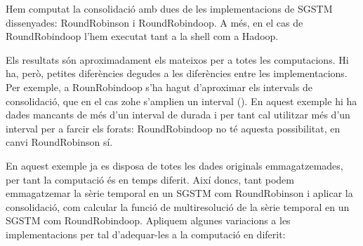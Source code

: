 Hem computat la consolidació amb dues de les implementacions de
\gls{SGSTM} dissenyades: RoundRobinson i RoundRobindoop. A més, en el
cas de RoundRobindoop l'hem executat tant a la shell com a Hadoop.



Els resultats són aproximadament els mateixos per a totes les
computacions. Hi ha, però, petites diferències degudes a les
diferències entre les implementacions. Per exemple, a RounRobindoop
s'ha hagut d'aproximar els intervals de consolidació, que en el cas
\gls{zohe} s'amplien un interval (). En
aquest exemple hi ha dades mancants de més d'un interval de
durada i per tant cal utilitzar més d'un interval per a farcir els
forats: RoundRobindoop no té aquesta possibilitat, en canvi
RoundRobinson sí.



En aquest exemple ja es disposa de totes les dades originals
emmagatzemades, per tant la computació és en temps diferit.  Així
doncs, tant podem emmagatzemar la sèrie temporal en un \gls{SGSTM} com
RoundRobinson i aplicar la consolidació, com calcular la funció de
multiresolució de la sèrie temporal en un \gls{SGSTM} com
RoundRobindoop.  Apliquem algunes variacions a les implementacions per
tal d'adequar-les a la computació en diferit:

